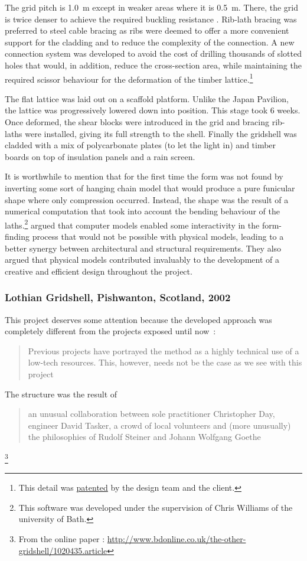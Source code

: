 The grid pitch is \SI{1.0}{m} except in weaker areas where it is \SI{0.5}{m}. There, the grid is twice denser to achieve the required buckling resistance \cite{Harris2003}. Rib-lath bracing was preferred to steel cable bracing as ribs were deemed to offer a more convenient support for the cladding and to reduce the complexity of the connection. A new connection system was developed to avoid the cost of drilling thousands of slotted holes that would, in addition, reduce the cross-section area, while maintaining the required scissor behaviour for the deformation of the timber lattice.\footnote{This detail was \href{https://patents.google.com/patent/GB2361504A/en?q=\%22A+coupling+and+a+method+of+constructing+grid+shell+buildings+using+such+a+coupling\%22&country=GB}{patented} by the design team and the client.}

The flat lattice was laid out on a scaffold platform. Unlike the Japan Pavilion, the lattice was progressively lowered down into position. This stage took 6 weeks. Once deformed, the shear blocks were introduced in the grid and bracing rib-laths were installed, giving its full strength to the shell. Finally the gridshell was cladded with a mix of polycarbonate plates (to let the light in) and timber boards on top of insulation panels and a rain screen.

It is worthwhile to mention that for the first time the form was not found by inverting some sort of hanging chain model that would produce a pure funicular shape where only compression occurred. Instead, the shape was the result of a numerical computation that took into account the bending behaviour of the laths.\footnote{This software was developed under the supervision of Chris Williams of the university of Bath.} \citet{Harris2003} argued that computer models enabled some interactivity in the form-finding process that would not be possible with physical models, leading to a better synergy between architectural and structural requirements. They also argued that physical models contributed invaluably to the development of a creative and efficient design throughout the project.

\subsubsection{Lothian Gridshell, Pishwanton, Scotland, 2002}
This project deserves some attention because the developed approach was completely different from the projects exposed until now~: \blockcquote[]{Lowenstein2002}{Previous projects have portrayed the method as a highly technical use of a low-tech resources. This, however, needs not be the case as we see with this project \belp{}}. The structure was the result of \blockcquote[]{bdonline2002}{\belp{} an unusual collaboration between sole practitioner Christopher Day, engineer David Tasker, a crowd of local volunteers and (more unusually) the philosophies of Rudolf Steiner and Johann Wolfgang Goethe}.\footnote{From the online paper  : \url{http://www.bdonline.co.uk/the-other-gridshell/1020435.article}}

